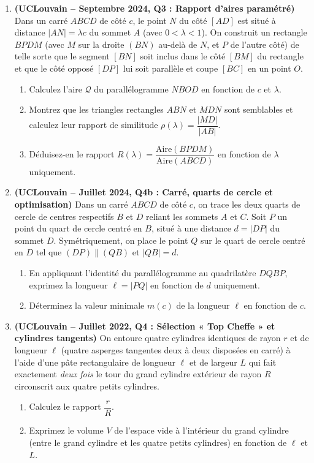 \begin{enumerate}[label=\textbf{Exercice 5.\arabic* --}, align=left, leftmargin=*]
    \item \textbf{(UCLouvain -- Septembre 2024, Q3 : Rapport d'aires paramétré)}
    Dans un carré $ABCD$ de côté $c$, le point $N$ du côté $[AD]$ est situé à distance $|AN| = \lambda c$ du sommet $A$ (avec $0 < \lambda < 1$). On construit un rectangle $BPDM$ (avec $M$ sur la droite $(BN)$ au-delà de $N$, et $P$ de l'autre côté) de telle sorte que le segment $[BN]$ soit inclus dans le côté $[BM]$ du rectangle et que le côté opposé $[DP]$ lui soit parallèle et coupe $[BC]$ en un point $O$.
    \begin{enumerate}[label=(\alph*)]
        \item Calculez l'aire $\mathcal{Q}$ du parallélogramme $NBOD$ en fonction de $c$ et $\lambda$.
        \item Montrez que les triangles rectangles $ABN$ et $MDN$ sont semblables et calculez leur rapport de similitude $\rho(\lambda) = \dfrac{|MD|}{|AB|}$.
        \item Déduisez-en le rapport $R(\lambda) = \dfrac{\text{Aire}(BPDM)}{\text{Aire}(ABCD)}$ en fonction de $\lambda$ uniquement.
    \end{enumerate}

    \item \textbf{(UCLouvain -- Juillet 2024, Q4b : Carré, quarts de cercle et optimisation)}
    Dans un carré $ABCD$ de côté $c$, on trace les deux quarts de cercle de centres respectifs $B$ et $D$ reliant les sommets $A$ et $C$. Soit $P$ un point du quart de cercle centré en $B$, situé à une distance $d = |DP|$ du sommet $D$. Symétriquement, on place le point $Q$ sur le quart de cercle centré en $D$ tel que $(DP) \parallel (QB)$ et $|QB| = d$.
    \begin{enumerate}[label=(\alph*)]
        \item En appliquant l'identité du parallélogramme au quadrilatère $DQBP$, exprimez la longueur $\ell = |PQ|$ en fonction de $d$ uniquement.
        \item Déterminez la valeur minimale $m(c)$ de la longueur $\ell$ en fonction de $c$.
    \end{enumerate}

    \item \textbf{(UCLouvain -- Juillet 2022, Q4 : Sélection « Top Cheffe » et cylindres tangents)}
    On entoure quatre cylindres identiques de rayon $r$ et de longueur $\ell$ (quatre asperges tangentes deux à deux disposées en carré) à l'aide d'une pâte rectangulaire de longueur $\ell$ et de largeur $L$ qui fait exactement \emph{deux fois} le tour du grand cylindre extérieur de rayon $R$ circonscrit aux quatre petits cylindres.
    \begin{enumerate}[label=(\alph*)]
        \item Calculez le rapport $\dfrac{r}{R}$.
        \item Exprimez le volume $V$ de l'espace vide à l'intérieur du grand cylindre (entre le grand cylindre et les quatre petits cylindres) en fonction de $\ell$ et $L$.
    \end{enumerate}


\end{enumerate}

